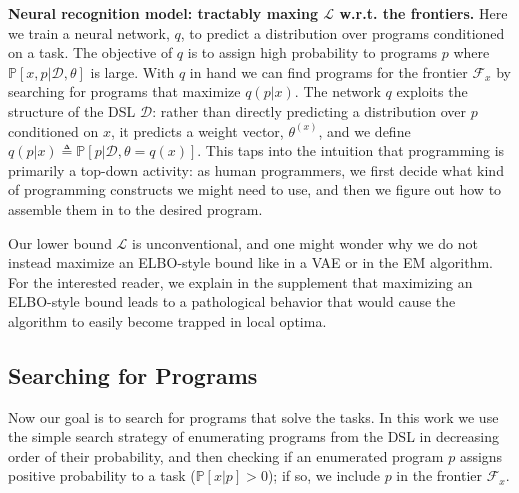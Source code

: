 \documentclass{article}
\newcommand{\lowerBound}{\mathscr{L}}
\newcommand{\probability}{\mathds{P}} %
\begin{document}
\textbf{Neural recognition model: tractably maxing $\lowerBound$ w.r.t. the
  frontiers.}  Here we train a neural network, $q$, to predict a
distribution over programs conditioned on a task. The objective of $q$
is to assign high probability to programs $p$ where
$\probability[x,p|\mathcal{D},\theta]$ is large.  With $q$ in hand we can find programs for
the frontier $\mathcal{F}_x$ by searching for programs that maximize
$q(p|x)$.
The network $q$ exploits the structure of the DSL $\mathcal{D}$:
rather than directly predicting a distribution over $p$ conditioned on $x$,
it predicts a weight vector, $\theta^{(x)}$, and we define $q(p|x)\triangleq \probability[p|\mathcal{D},\theta = q(x)]$.
This taps into the intuition that programming is primarily a top-down activity:
as human programmers, we first decide what kind of
programming constructs we might need to use,
and then we figure out how to assemble them in to the desired program.

Our lower bound $\lowerBound$ is unconventional,
and one might wonder why we do not instead maximize an ELBO-style bound like in a VAE or in the EM algorithm.
For the interested reader, we explain in the supplement that maximizing an ELBO-style bound
leads to a pathological behavior that would cause the algorithm to easily become trapped in local optima.





\subsection{Searching for Programs}\label{explorationSection}

Now our goal is to search for programs that solve the tasks.  In this
work we use the simple search strategy of enumerating programs from
the DSL  in decreasing order of their probability,
and then checking if an enumerated program $p$ assigns positive
probability to a task ($\probability[x|p] > 0$); if so, we include $p$ in
the frontier $\mathcal{F}_x$.
\end{document}
